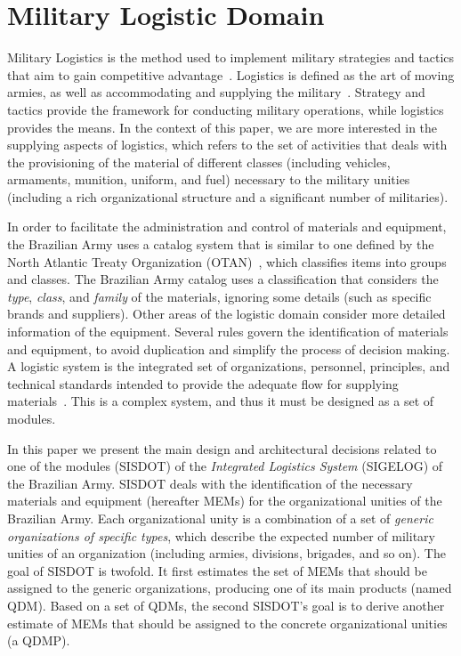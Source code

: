 
\section{Military Logistic Domain}
\label{sec:logistics}

Military Logistics is the method used to implement military strategies and tactics that aim to gain competitive advantage~\cite{rutner2012}. Logistics is defined as the art of moving armies, as well as accommodating and supplying the military~\cite{prebilic2006}. Strategy and tactics provide the framework for conducting military operations, while logistics provides the means. In the context of this paper, we are more interested in the supplying aspects of logistics, which refers to the set of activities that deals with the  provisioning of the material of different classes (including vehicles, armaments, munition, uniform, and fuel) necessary to the military unities (including a rich organizational structure and a significant number of militaries). 

In order to facilitate the administration and control of materials and equipment, the Brazilian Army uses a catalog system that is similar to one defined by the North Atlantic Treaty Organization (OTAN)~\cite{otan2012}, which classifies items into groups and classes. The Brazilian Army catalog uses a classification that considers the \emph{type}, \emph{class}, and \emph{family} of the materials, ignoring some details (such as specific brands and suppliers). Other areas of the logistic
domain consider more detailed information of the equipment. Several rules govern the identification of materials and equipment, to avoid duplication and simplify the process of decision making. A logistic system is the integrated set of organizations, personnel, principles, and technical standards intended to provide the adequate flow for supplying materials~\cite{brasil2003}. This is a complex system, and thus it must be designed as a set of modules. 

In this paper we present the main design and architectural decisions related to one of the modules (SISDOT) of the \emph{Integrated Logistics System} (SIGELOG) of the Brazilian Army. SISDOT deals with the identification of the necessary materials and equipment (hereafter MEMs) for the organizational unities of the Brazilian Army. Each organizational unity is a combination of a set of \emph{generic organizations of specific types}, which describe the expected number of military unities of an organization (including armies, divisions, brigades, and so on). The goal of SISDOT is twofold. It first estimates the set of MEMs that should be assigned to the generic organizations, producing one of its main products (named QDM). Based on a set of QDMs, the second SISDOT's goal is to derive another estimate of MEMs that should be assigned to the concrete organizational unities (a QDMP). 

